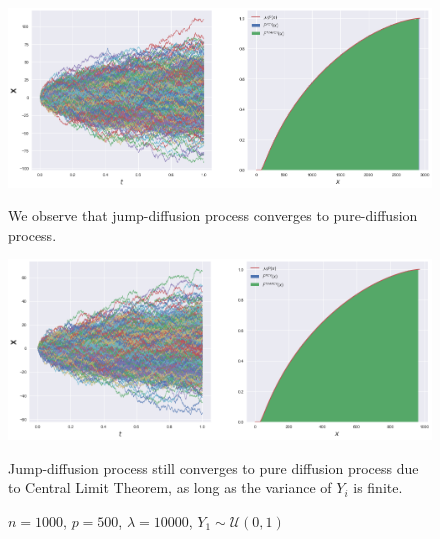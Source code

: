 \documentclass[a4paper,11pt]{book}
\theoremstyle{plain}
\theoremstyle{definition}
\begin{document}
    \begin{figure}
       	\begin{center} \centering
       		\includegraphics[scale=0.4]{XCompound}
       		\caption{$n = 1000$, $p = 500$, $\lambda = 10000$, $Y_1 \sim \mathcal{N}(0, 1)$}
       		\smallskip
       		\small
       		We observe that jump-diffusion process converges to pure-diffusion process.
       	\end{center}
       	\begin{center} \centering
       		\includegraphics[scale=0.4]{XCompounduni}
       		\caption{$n = 1000$, $p = 500$, $\lambda = 10000$, $Y_1 \sim \mathcal{U}(0, 1)$}
       		\smallskip
       		\small
       		Jump-diffusion process still converges to pure diffusion process due to Central Limit Theorem, as long as the variance of $Y_i$ is finite.
       	\end{center}
    \end{figure}
    
\end{document}
